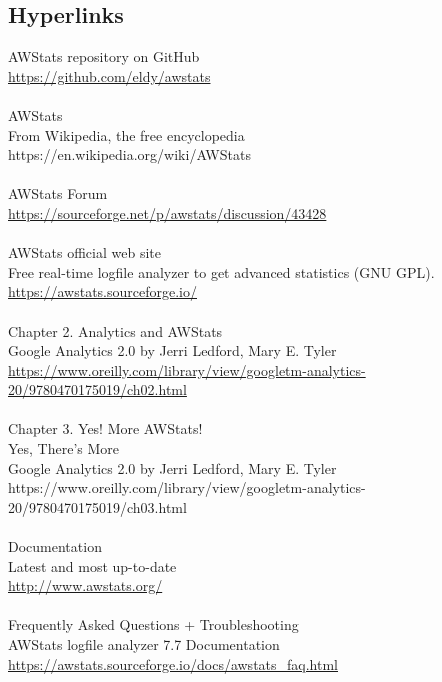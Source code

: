 
\subsection{Hyperlinks}

AWStats repository on GitHub\\
\href{https://github.com/eldy/awstats}{https://github.com/eldy/awstats}\\
\\
AWStats\\
From Wikipedia, the free encyclopedia\\
https://en.wikipedia.org/wiki/AWStats\\
\\
AWStats Forum\\
\href{https://sourceforge.net/p/awstats/discussion/43428}{https://sourceforge.net/p/awstats/discussion/43428}\\
\\
AWStats official web site\\
Free real-time logfile analyzer to get advanced statistics (GNU GPL).\\
\href{https://awstats.sourceforge.io/}{https://awstats.sourceforge.io/}\\
\\
Chapter 2. Analytics and AWStats\\
Google Analytics 2.0 by Jerri Ledford, Mary E. Tyler\\
\href{https://www.oreilly.com/library/view/googletm-analytics-20/9780470175019/ch02.html}{https://www.oreilly.com/library/view/googletm-analytics-20/9780470175019/ch02.html}\\
\\
Chapter 3. Yes! More AWStats!\\
Yes, There’s More\\
Google Analytics 2.0 by Jerri Ledford, Mary E. Tyler\\
https://www.oreilly.com/library/view/googletm-analytics-20/9780470175019/ch03.html\\
\\
Documentation\\
Latest and most up-to-date\\
\href{http://www.awstats.org/}{http://www.awstats.org/}\\
\\
Frequently Asked Questions + Troubleshooting\\
AWStats logfile analyzer 7.7 Documentation\\
\href{https://awstats.sourceforge.io/docs/awstats\_faq.html}{https://awstats.sourceforge.io/docs/awstats\_faq.html}
